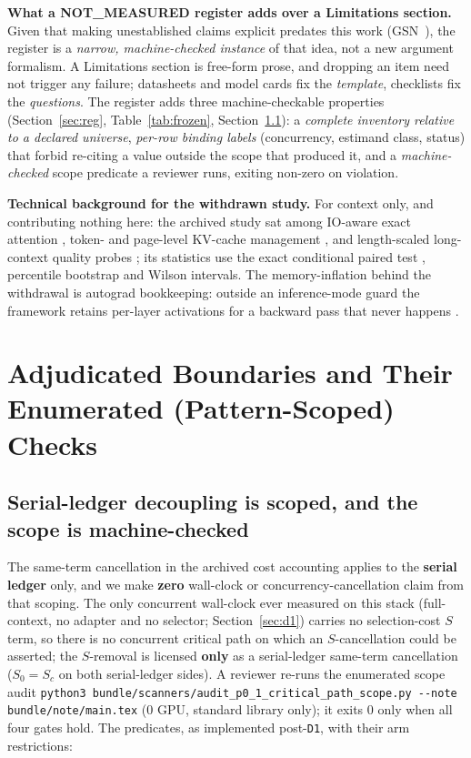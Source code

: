 \documentclass{article}
\newcommand{\zb}{\discretionary{}{}{}}
\newcommand{\code}[1]{\texttt{#1}}
\begin{document}
\textbf{What a NOT\_MEASURED register adds over a Limitations section.} Given that making
unestablished claims explicit predates this work (GSN~\citep{kelly2004gsn}), the register is a
\emph{narrow, machine-checked instance} of that idea, not a new argument formalism. A Limitations
section is free-form prose, and dropping an item need not trigger any failure;
datasheets and model cards fix the \emph{template}, checklists fix the \emph{questions}. The
register adds three machine-checkable properties (Section~\ref{sec:reg},
Table~\ref{tab:frozen}, Section~\ref{sec:p01}): a \emph{complete inventory relative to a declared
universe}, \emph{per-row binding labels} (concurrency, estimand class, status) that forbid
re-citing a value outside the scope that produced it, and a \emph{machine-checked} scope predicate
a reviewer runs, exiting non-zero on violation.

\textbf{Technical background for the withdrawn study.} For context only, and contributing
nothing here: the archived study sat among IO-aware exact attention
\citep{dao2022flashattention}, token- and page-level KV-cache management
\citep{zhang2023h2o,xiao2024streamingllm,adnan2024keyformer,kwon2023pagedattention,ge2024fastgen},
and length-scaled long-context quality probes \citep{hsieh2024ruler,li2023longeval}; its
statistics use the exact conditional paired test \citep{mcnemar1947}, percentile bootstrap
\citep{efron1993bootstrap} and Wilson \citep{wilson1927interval} intervals. The memory-inflation
behind the withdrawal is autograd bookkeeping: outside an inference-mode guard the framework
retains per-layer activations for a backward pass that never happens \citep{paszke2019pytorch}.

\section{Adjudicated Boundaries and Their Enumerated (Pattern-Scoped) Checks}\label{sec:bound}

\subsection{Serial-ledger decoupling is scoped, and the scope is machine-checked}\label{sec:p01}
The same-term cancellation in the archived cost accounting applies to the \textbf{serial
ledger} only, and we make \textbf{zero} wall-clock or concurrency-cancellation claim from that
scoping. The only concurrent wall-clock ever measured on this stack (full-context, no adapter
and no selector; Section~\ref{sec:d1}) carries no selection-cost $S$ term, so there is no
concurrent critical path on which an $S$-cancellation could be asserted; the $S$-removal is
licensed \textbf{only} as a serial-ledger same-term cancellation ($S_0{=}S_c$ on both
serial-ledger sides). A reviewer re-runs the enumerated scope audit
\code{python3 bundle/scanners/\zb audit\_p0\_1\_\zb critical\_path\_scope.py -{}-note bundle/note/main.tex}
(0 GPU, standard library only); it exits 0 only when all four gates hold. The predicates, as
implemented post-\texttt{D1}, with their arm restrictions:
\end{document}
